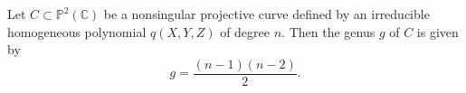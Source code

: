 Let $C \subset \mathbb{P}^2(\mathbb{C})$ be a nonsingular projective curve defined by an irreducible homogeneous polynomial $q(X, Y, Z)$ of degree $n$. Then the genus $g$ of $C$ is given by
$$g = \frac{(n-1)(n-2)}{2}.$$
